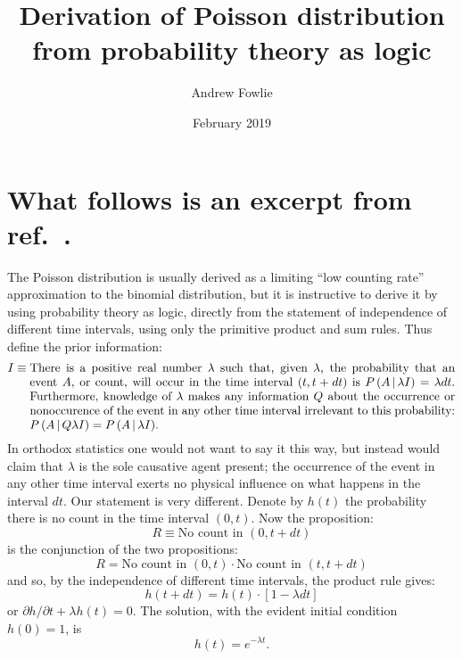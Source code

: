 \documentclass[12pt]{article}
\title{Derivation of Poisson distribution from probability theory as logic}
\author{Andrew Fowlie}
\date{February 2019}
\affil{Nanjing Normal University}
\newcommand{\refcite}[1]{ref.~\cite{#1}}
\newcommand{\given}{\, \middle| \,}
\newcommand{\Prob}[2]{P\left(#1 \given #2 \right)}
\begin{document}
\maketitle


%
%

\section{What follows is an excerpt from \refcite{jaynes}.}


The Poisson distribution is usually derived as a limiting ``low counting rate'' approximation to the
binomial distribution, but it is instructive to derive it by using probability theory as logic, directly
from the statement of independence of different time intervals, using only the primitive product
and sum rules. Thus define the prior information:
\begin{equation}
I \equiv \text{\parbox[t][][t]{12.5cm}{There is a positive real number $\lambda$ such that, given $\lambda$, the probability that an event
$A$, or count, will occur in the time interval $(t, t + dt)$ is $\Prob{A}{\lambda I} = \lambda dt$. Furthermore,
knowledge of $\lambda$ makes any information $Q$ about the occurrence or nonoccurence
of the event in any other time interval irrelevant to this probability: $\Prob{A}{Q \lambda I} =
\Prob{A}{\lambda I}$.}}
\end{equation}
In orthodox statistics one would not want to say it this way, but instead would claim that $\lambda$ is
the sole causative agent present; the occurrence of the event in any other time interval exerts no
physical influence on what happens in the interval $dt$. Our statement is very different.
Denote by $h(t)$ the probability there is no count in the time interval $(0, t)$. Now the proposition:
\begin{equation}
R \equiv \text{No count in $(0, t + dt)$} 
\end{equation}
is the conjunction of the two propositions:
\begin{equation}
R =  \text{No count in $(0,t)$} \cdot \text{No count in $(t, t + dt)$}
\end{equation}
and so, by the independence of different time intervals, the product rule gives:
\begin{equation}
h(t + dt) = h(t) \cdot \left[1 - \lambda dt \right]
\end{equation}
or $\partial h / \partial t + \lambda h(t) = 0$. The solution, with the evident initial condition $h(0) = 1$, is
\begin{equation}
h(t)= e^{-\lambda t}.
\end{equation}
\end{document}

